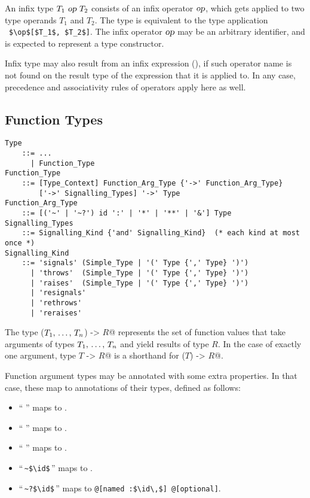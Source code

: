 An infix type $T_1\ \mbox{\sl op}\ T_2$ consists of an infix operator $\mbox{\sl op}$, which gets applied to two type operands $T_1$ and $T_2$. The type is equivalent to the type application ~\lstinline!$\op$[$T_1$, $T_2$]!. The infix operator $\mbox{\sl op}$ may be an arbitrary identifier, and is expected to represent a type constructor. 

Infix type may also result from an infix expression (), if such operator name is not found on the result type of the expression that it is applied to. In any case, precedence and associativity rules of operators apply here as well. 





\subsection{Function Types}
\label{sec:function-types}

\grammar\begin{lstlisting}
Type
    ::= ...
      | Function_Type
Function_Type 
    ::= [Type_Context] Function_Arg_Type {'->' Function_Arg_Type}
        ['->' Signalling_Types] '->' Type
Function_Arg_Type
    ::= [('~' | '~?') id ':' | '*' | '**' | '&'] Type
Signalling_Types
    ::= Signalling_Kind {'and' Signalling_Kind}  (* each kind at most once *)
Signalling_Kind
    ::= 'signals' (Simple_Type | '(' Type {',' Type} ')')
      | 'throws'  (Simple_Type | '(' Type {',' Type} ')')
      | 'raises'  (Simple_Type | '(' Type {',' Type} ')')
      | 'resignals'
      | 'rethrows'
      | 'reraises'
\end{lstlisting}

The type \lstinline@($T_1 ,\, \ldots ,\, T_n$) -> $R$@ represents the set of function values that take arguments of types $T_1 ,\, \ldots ,\, T_n$ and yield results of type $R$. In the case of exactly one argument, type \lstinline@$T$ -> $R$@ is a shorthand for \lstinline@($T$) -> $R$@. 

Function argument types may be annotated with some extra properties. In that case, these map to annotations of their types, defined as follows:
\begin{itemize}
\item ``\,\code{*}\,'' maps to . 
\item ``\,\code{**}\,'' maps to . 
\item ``\,\code{&}\,'' maps to . 
\item ``\,\lstinline!~$\id$!\,'' maps to . 
\item ``\,\lstinline!~?$\id$!\,'' maps to \lstinline[deletekeywords={optional}]!@[named :$\id\,$] @[optional]!. 
\end{itemize}

